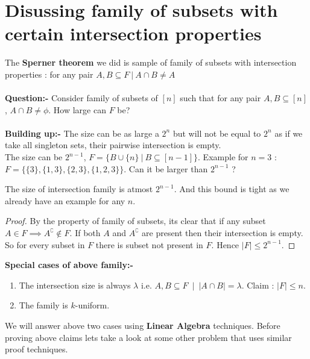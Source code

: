 \section{Disussing family of subsets with certain intersection properties}
The \textbf{Sperner theorem} we did is sample of family of subsets with intersection properties : for any pair $A,B \subseteq F ~|~ A\cap B \neq A$\\\\
\textbf{Question:-} Consider  family of subsets of $[n]$ such that for any pair $A,B \subseteq [n]$, $A \cap B \neq \phi$. How large can $F$ be?\\\\
\textbf{Building up:-} The size can be as large a $2^n$ but will not be equal to $2^n$ as if we take all singleton sets, their pairwise intersection is empty.\\ The size can be $2^{n-1}$, $F = \{ B \cup \{n\}~ | ~B\subseteq[n-1] \}$. Example for $n=3$ : $F=\{\{3\},\{1,3\},\{2,3\},\{1,2,3\}\}$. Can it be larger than $2^{n-1}$ ?
\begin{theorem} The size of intersection family is atmost $2^{n-1}$. And this bound is tight as we already have an example for any $n$.
\begin{proof}
By the property of family of subsets, its clear that if any subset $A \in F \implies {A}^\complement \notin F$. If both $A$ and $A^\complement$ are present then their intersection is empty. So for every subset in $F$ there is subset not present in $F$. Hence $|F| \le 2^{n-1}$.
\end{proof}
\end{theorem}
\textbf{Special cases of above family:-}
\begin{enumerate}
\item The intersection size is always $\lambda$ i.e. $A,B \subseteq F ~ \mid ~ |A \cap B|=\lambda$. Claim : $|F|\le n$.
\item The family is $k$-uniform.
\end{enumerate}
We will answer above two cases using \textbf{Linear Algebra} techniques. Before proving above claims lets take a look at some other problem that uses similar proof techniques.


